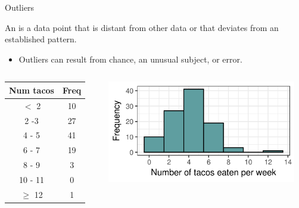 \documentclass[xcolor=table, aspectratio=169, bigger]{beamer}
\begin{document}
\begin{frame}{Outliers}
\begin{block}{}
An  is a data point that is distant from other data or that deviates from an established pattern.

\begin{itemize}
\item Outliers can result from chance, an unusual subject, or error.
\end{itemize}
\end{block}

\pause

\begin{columns}
\begin{column}{0.35\textwidth}
\begin{exampleblock}{}
\begin{center}
\begin{tabular}{cc}
Num tacos & Freq \\
\hline
 $<$ 2 & 10 \\
2 -3 & 27 \\
4 - 5 & 41 \\
6 - 7 & 19 \\
8 - 9 & 3 \\
10 - 11 & 0 \\
$\ge$ 12 & 1 \\
\end{tabular}
\end{center}
\end{exampleblock}
\end{column}

\begin{column}{0.65\textwidth}
\begin{center}
\includegraphics[width=3.25in]{../images/wk04_taco_out_hist}

\end{center}
\end{column}
\end{columns}
\end{frame}
\end{document}
